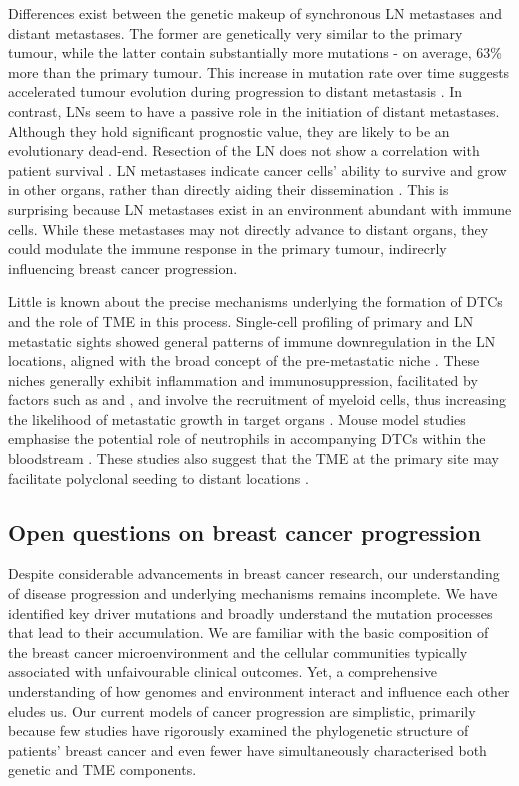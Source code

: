 Differences exist between the genetic makeup of synchronous \acf{LN} metastases and distant metastases. The former are genetically very similar to the primary tumour, while the latter contain substantially more mutations - on average, 63\% more than the primary tumour. This increase in mutation rate over time suggests accelerated tumour evolution during progression to distant metastasis \parencite{Yates2017-xc}. In contrast, \ac{LN}s seem to have a passive role in the initiation of distant metastases. Although they hold significant prognostic value, they are likely to be an evolutionary dead-end. Resection of the \ac{LN} does not show a correlation with patient survival \parencite{Fisher1977-ua}. \ac{LN} metastases indicate cancer cells' ability to survive and grow in other organs, rather than directly aiding their dissemination \parencite{Ullah2018-xe}. This is surprising because \ac{LN} metastases exist in an environment abundant with immune cells. While these metastases may not directly advance to distant organs, they could modulate the immune response in the primary tumour, indirecrly influencing breast cancer progression.

Little is known about the precise mechanisms underlying the formation of \acp{DTC} and the role of \ac{TME} in this process. Single-cell profiling of primary and \ac{LN} metastatic sights showed general patterns of immune downregulation in the \ac{LN} locations, aligned with the broad concept of the pre-metastatic niche  \parencite{Liu2022-mt}. These niches generally exhibit inflammation and immunosuppression, facilitated by factors such as  and , and involve the recruitment of myeloid cells, thus increasing the likelihood of metastatic growth in target organs \parencite{Peinado2017-hz}. Mouse model studies emphasise the potential role of neutrophils in accompanying \acp{DTC} within the bloodstream  \parencite{Szczerba2019-mt}. These studies also suggest that the \ac{TME} at the primary site may facilitate polyclonal seeding to distant locations \parencite{Cheung2016-nb}.

\subsection{Open questions on breast cancer progression}

Despite considerable advancements in breast cancer research, our understanding of disease progression and underlying mechanisms remains incomplete. We have identified key driver mutations and broadly understand the mutation processes that lead to their accumulation. We are familiar with the basic composition of the breast cancer microenvironment and the cellular communities typically associated with unfaivourable clinical outcomes. Yet, a comprehensive understanding of how genomes and environment interact and influence each other eludes us. Our current models of cancer progression are simplistic, primarily because few studies have rigorously examined the phylogenetic structure of patients' breast cancer and even fewer have simultaneously characterised both genetic and \ac{TME} components.

